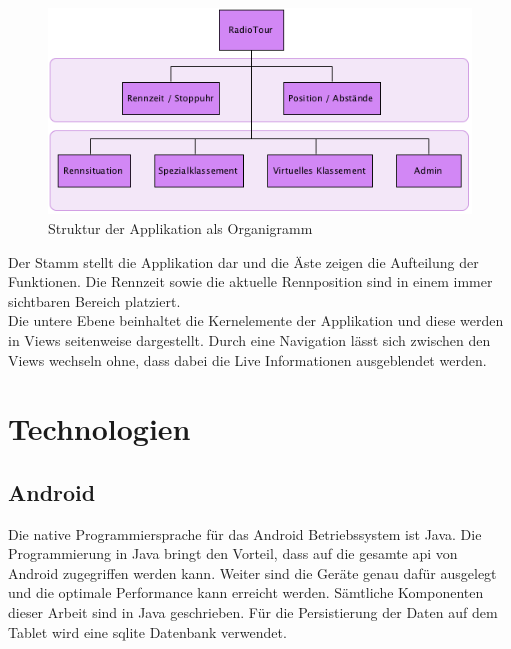 \begin{figure}[h!]
\caption{Struktur der Applikation als Organigramm}
\centering
\includegraphics{05bericht/images/struktur.png}
\end{figure} 

Der Stamm stellt die Applikation dar und die Äste zeigen die Aufteilung der Funktionen. Die Rennzeit sowie die aktuelle Rennposition sind in einem immer sichtbaren Bereich platziert.
\\
Die untere Ebene beinhaltet die Kernelemente der Applikation und diese werden in Views seitenweise dargestellt. Durch eine Navigation lässt sich zwischen den Views wechseln ohne, dass dabei die Live Informationen ausgeblendet werden.


\section{Technologien}
\subsection{Android}
Die native Programmiersprache für das Android Betriebssystem ist Java. Die Programmierung in Java bringt den Vorteil, dass auf die gesamte \gls{api} von Android zugegriffen werden kann. Weiter sind die Geräte genau dafür ausgelegt und die optimale Performance kann erreicht werden. Sämtliche Komponenten dieser Arbeit sind in Java geschrieben. Für die Persistierung der Daten auf dem Tablet wird eine \gls{sqlite} Datenbank verwendet.

